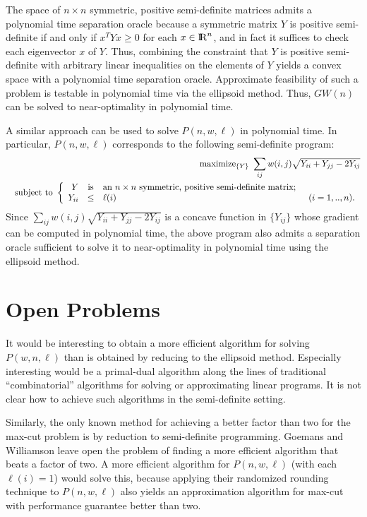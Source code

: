 \documentclass[11pt]{article}
\makeatletter
\newcommand\real{{\rm I\kern-0.2em\rm R}}
\newenvironment{opt}[2]{
\samepage
\renewcommand{\arraystretch}{1.3}
\begin{eqnarray*}
& & \mbox{#1\ } #2 \\
& & \mbox{subject to\ }\left\{ \begin{array}{rcl@{\hspace{0.2in}}l}}{
\end{array}\right.
\end{eqnarray*}
}
\newcommand{\mathfn}[1]{\mathop{\rm #1}\nolimits }
\newcommand{\maximize}{\mathfn{maximize}}
\makeatother
\begin{document}
The space of $n\times n$ symmetric, positive semi-definite matrices
admits a polynomial time separation oracle
because a symmetric matrix $Y$ is positive semi-definite
if and only if $x^T Y x \ge 0$ for each $x\in\real^n$,
and in fact it suffices to check each eigenvector $x$ of $Y$.
Thus, combining the constraint that $Y$ is positive semi-definite
with arbitrary linear inequalities on the elements of $Y$
yields a convex space with a polynomial time separation oracle.
Approximate feasibility of such a problem is testable in polynomial time
via the ellipsoid method.  
Thus, $GW(n)$ can be solved to near-optimality in polynomial time.

A similar approach can be used to solve $P(n,w,\ell)$ in polynomial time.
In particular, $P(n,w,\ell)$ 
corresponds to the following semi-definite program:
\begin{opt}{$\maximize_{\{Y\}}$}{
    \sum_{ij} w(i,j)\sqrt{Y_{ii}+Y_{jj}-2 Y_{ij}}}
  Y & \mbox{is} & 
        \mbox{an $n\times n$ symmetric, positive semi-definite matrix};
  \\ Y_{ii} & \le & \ell(i) & (i=1,..,n).
\end{opt}
Since $\sum_{ij} w(i,j)\sqrt{Y_{ii}+Y_{jj}-2 Y_{ij}}$
is a concave function in $\{Y_{ij}\}$
whose gradient can be computed in polynomial time,
the above program also admits a separation oracle
sufficient to solve it to near-optimality in polynomial time
using the ellipsoid method.

\section{Open Problems}
It would be interesting to obtain a more efficient algorithm
for solving $P(w,n,\ell)$ than is obtained by reducing to the ellipsoid method.
Especially interesting would be a primal-dual algorithm
along the lines of traditional ``combinatorial'' algorithms
for solving or approximating linear programs.
It is not clear how to achieve such algorithms 
in the semi-definite setting.

Similarly, the only known method for achieving a better factor than two
for the max-cut problem is by reduction to semi-definite programming.
Goemans and Williamson leave open the problem 
of finding a more efficient algorithm that beats a factor of two.
A more efficient algorithm for $P(n,w,\ell)$ (with each $\ell(i) = 1$)
would solve this,
because applying their randomized rounding technique
to $P(n,w,\ell)$ also yields an approximation algorithm for max-cut
with performance guarantee better than two.
\end{document}
